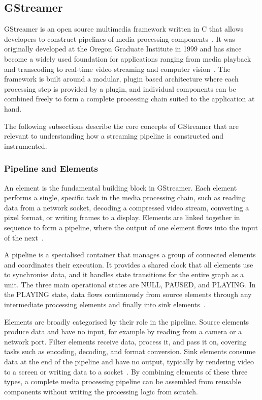 \vspace{5mm}
\subsection{GStreamer}\label{subsec:gstreamer}
GStreamer is an open source multimedia framework written in C that allows developers to construct pipelines of media processing components~\cite{gstreamer_intro}. It was originally developed at the Oregon Graduate Institute in 1999 and has since become a widely used foundation for applications ranging from media playback and transcoding to real-time video streaming and computer vision~\cite{gstreamer_intro}. The framework is built around a modular, plugin based architecture where each processing step is provided by a plugin, and individual components can be combined freely to form a complete processing chain suited to the application at hand.
 
The following subsections describe the core concepts of GStreamer that are relevant to understanding how a streaming pipeline is constructed and instrumented.

\subsubsection{Pipeline and Elements}\label{subsec:pipeline-elements}
An element is the fundamental building block in GStreamer. Each element performs a single, specific task in the media processing chain, such as reading data from a network socket, decoding a compressed video stream, converting a pixel format, or writing frames to a display. Elements are linked together in sequence to form a pipeline, where the output of one element flows into the input of the next~\cite{gstreamer_elements}.
 
A pipeline is a specialised container that manages a group of connected elements and coordinates their execution. It provides a shared clock that all elements use to synchronise data, and it handles state transitions for the entire graph as a unit. The three main operational states are NULL, PAUSED, and PLAYING. In the PLAYING state, data flows continuously from source elements through any intermediate processing elements and finally into sink elements~\cite{gstreamer_elements}.
 
Elements are broadly categorised by their role in the pipeline. Source elements produce data and have no input, for example by reading from a camera or a network port. Filter elements receive data, process it, and pass it on, covering tasks such as encoding, decoding, and format conversion. Sink elements consume data at the end of the pipeline and have no output, typically by rendering video to a screen or writing data to a socket~\cite{gstreamer_elements}. By combining elements of these three types, a complete media processing pipeline can be assembled from reusable components without writing the processing logic from scratch.

